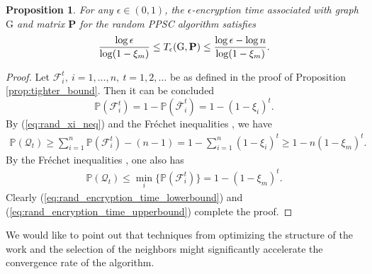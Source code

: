 \documentclass[a4paper, 11pt]{article}
\newcommand{\1}{\mathbf{1}}
\newcommand{\Pb}{\mathbf{P}}
\newcommand{\mG}{\mathrm{G}}
\newtheorem{proposition}{Proposition}
\begin{document}
\begin{proposition}\label{prop:encryption_time_bounds}
	For any $\epsilon\in(0,1)$, the $\epsilon$-encryption time associated with graph $\mG$ and matrix $\Pb$ for the random PPSC algorithm satisfies
	\begin{equation}\notag
	\frac{\log\epsilon}{\log(1-\xi_m)} \le T_\epsilon(\mG,\Pb) \le \frac{\log\epsilon-\log n}{\log(1-\xi_m)}.
	\end{equation}
\end{proposition}
\begin{proof}
	Let $\mathcal{F}^t_i,\ i=1,\dots,n,\ t=1,2,\dots$ be as defined in the proof of Proposition \ref{prop:tighter_bound}. Then it can be concluded
	\begin{equation}\label{eq:rand_xi_neq}
	\mathbb{P}(\mathcal{F}_i^{t}) = 1-\mathbb{P}(\overline{\mathcal{F}}_i^{t})=1-(1-\xi_i)^t.
	\end{equation}
	By (\ref{eq:rand_xi_neq}) and the Fr{\'e}chet inequalities \cite{frechet1935generalisation}, we have{
		\begin{equation}
		\begin{aligned}
		\mathbb{P}(\mathcal{Q}_t) \ge \sum\limits_{i=1}^n \mathbb{P}(\mathcal{F}_i^{t})-(n-1)= 1-\sum\limits_{i=1}^n(1-\xi_i)^t\ge 1-n(1-\xi_m)^t.\label{eq:rand_encryption_time_lowerbound}
		\end{aligned}
		\end{equation}
		By the Fr{\'e}chet inequalities \cite{frechet1935generalisation}, one also has
		\begin{align}
		\mathbb{P}(\mathcal{Q}_t) \le \min_i\{\mathbb{P}(\mathcal{F}_i^{t})\} = 1-(1-\xi_m)^t. \label{eq:rand_encryption_time_upperbound}
		\end{align}}
	Clearly (\ref{eq:rand_encryption_time_lowerbound}) and (\ref{eq:rand_encryption_time_upperbound}) complete the proof.
\end{proof}



We would like to point out that techniques from optimizing the structure of the work and the selection of the neighbors \cite{boyd-2004,doerr-2012,shiton2016} might significantly accelerate the convergence rate of the algorithm.
\end{document}
